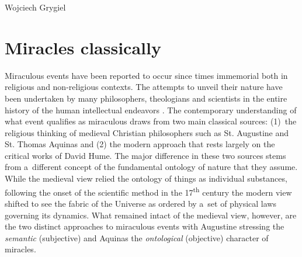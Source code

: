 \begin{artengenv}{Wojciech Grygiel}
\section*{Miracles classically}
Miraculous events have been reported to occur since times immemorial both in religious and non-religious contexts. The attempts to unveil their nature have been undertaken by many philosophers, theologians and scientists in the entire history of the human intellectual endeavors
\parencite[e.g.][]{basinger_miracles_2018}. %
 The contemporary understanding of what event qualifies as miraculous draws from two main classical sources: (1)~the religious thinking of medieval Christian philosophers such as St. Augustine and St. Thomas Aquinas and (2) the modern approach that rests largely on the critical works of David Hume. The major difference in these two sources stems from a~different concept of the fundamental ontology of nature that they assume. While the medieval view relied the ontology of things as individual substances, following the onset of the scientific method in the 17\textsuperscript{th} century the modern view shifted to see the fabric of the Universe as ordered by a~set of physical laws governing its dynamics. What remained intact of the medieval view, however, are the two distinct approaches to miraculous events with Augustine stressing the \textit{semantic} (subjective) and Aquinas the \textit{ontological} (objective) character of miracles.


\end{artengenv}
